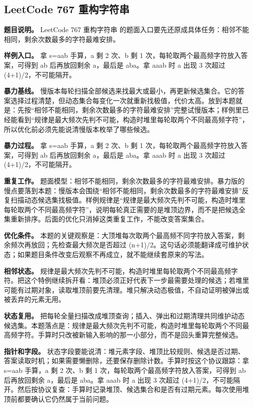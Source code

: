 \subsection{LeetCode 767 重构字符串}

\textbf{题目说明。} LeetCode 767 重构字符串 的题面入口要先还原成具体任务：相邻不能相同，剩余次数最多的字符最难安排。

\textbf{样例入口。} 拿 s=aab 手算，a 剩 2 次、b 剩 1 次，每轮取两个最高频字符放入答案，可得到 ab 后再放回剩余 a，最后是 aba。拿 aaab 时 a 出现 3 次超过 (4+1)/2，不可能隔开。

\textbf{暴力基线。} 慢版本每轮扫描全部候选来找最大或最小，再更新候选集合。它的答案选择过程清楚，但动态集合每变化一次就重新找极值，代价太高。放到本题就是：先按“相邻不能相同，剩余次数最多的字符最难安排”完整试慢版本；样例里已经能看到“规律是最大频次先判不可能，构造时堆里每轮取两个不同最高频字符”，所以优化前必须先能说清慢版本枚举了哪些候选。

\textbf{暴力过程。} 拿 s=aab 手算，a 剩 2 次、b 剩 1 次，每轮取两个最高频字符放入答案，可得到 ab 后再放回剩余 a，最后是 aba。拿 aaab 时 a 出现 3 次超过 (4+1)/2，不可能隔开。

\textbf{重复工作。} 题面模型：相邻不能相同，剩余次数最多的字符最难安排。暴力版的慢点要落到本题：慢版本会围绕“相邻不能相同，剩余次数最多的字符最难安排”反复扫描动态候选集找极值。样例规律是“规律是最大频次先判不可能，构造时堆里每轮取两个不同最高频字符”，说明每轮真正需要的是堆顶边界，而不是把候选全集重新排序。后面的优化只消掉这类重复工作，不能改变答案集合。

\textbf{优化条件。} 本题的关键观察是：大顶堆每次取两个最高频不同字符放入答案，剩余频次再放回；先检查最大频次是否超过 (n+1)/2。这句话必须能翻译成可维护状态；如果题目条件改变后观察不再成立，就不能继续套原来的写法。

\textbf{相邻状态。} 规律是最大频次先判不可能，构造时堆里每轮取两个不同最高频字符。把这个特例继续拆开看：堆顶必须正好代表下一步最需要处理的候选；若堆里可能有过期对象，读取堆顶前要先清理。堆只解决动态极值，不自动证明被弹出或被丢弃的元素无用。

\textbf{状态复用。} 把每轮全量扫描改成堆顶查询；插入、弹出和过期清理共同维护动态候选集。本题落点是：规律是最大频次先判不可能，构造时堆里每轮取两个不同最高频字符。手算时只改被新输入影响的那一小部分，而不是回头重算完整候选。

\textbf{指针和字段。} 状态字段要能说清：堆元素字段、堆顶比较规则、候选是否过期、答案读取时机；如果需要懒删除，还要保存删除计数。手算时按这个协议跟踪：拿 s=aab 手算，a 剩 2 次、b 剩 1 次，每轮取两个最高频字符放入答案，可得到 ab 后再放回剩余 a，最后是 aba。拿 aaab 时 a 出现 3 次超过 (4+1)/2，不可能隔开。然后按协议复查：手算时记录堆顶、候选集合和是否有过期元素。每次使用堆顶前都要确认它仍然属于当前问题。

